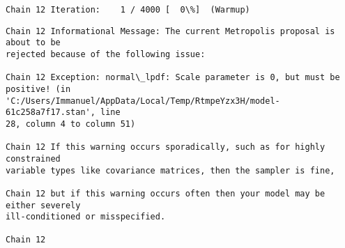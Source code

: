 \documentclass[11pt]{article}
\begin{document}
    \begin{Verbatim}[commandchars=\\\{\}]
Chain 12 Iteration:    1 / 4000 [  0\%]  (Warmup)
    \end{Verbatim}

    \begin{Verbatim}[commandchars=\\\{\}]
Chain 12 Informational Message: The current Metropolis proposal is about to be
rejected because of the following issue:

Chain 12 Exception: normal\_lpdf: Scale parameter is 0, but must be positive! (in
'C:/Users/Immanuel/AppData/Local/Temp/RtmpeYzx3H/model-61c258a7f17.stan', line
28, column 4 to column 51)

Chain 12 If this warning occurs sporadically, such as for highly constrained
variable types like covariance matrices, then the sampler is fine,

Chain 12 but if this warning occurs often then your model may be either severely
ill-conditioned or misspecified.

Chain 12

    \end{Verbatim}
\end{document}
